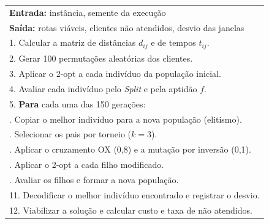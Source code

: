 \begin{quadro}[htb]
	\centering
	\caption{Fluxo do Algoritmo Genético Híbrido (GA+LS)}
	\label{quadro:gals}
	\begin{tabular}{p{}}
		\toprule
		\textbf{Entrada:} instância, semente da execução \\
		\textbf{Saída:} rotas viáveis, clientes não atendidos, desvio das janelas \\
		\midrule
		1. Calcular a matriz de distâncias $d_{ij}$ e de tempos $t_{ij}$. \\
		2. Gerar 100 permutações aleatórias dos clientes. \\
		3. Aplicar o 2-opt a cada indivíduo da população inicial. \\
		4. Avaliar cada indivíduo pelo \textit{Split} e pela aptidão $f$. \\
		5. \textbf{Para} cada uma das 150 gerações: \\
		\quad 6. Copiar o melhor indivíduo para a nova população (elitismo). \\
		\quad 7. Selecionar os pais por torneio ($k = 3$). \\
		\quad 8. Aplicar o cruzamento OX (0,8) e a mutação por inversão (0,1). \\
		\quad 9. Aplicar o 2-opt a cada filho modificado. \\
		\quad 10. Avaliar os filhos e formar a nova população. \\
		11. Decodificar o melhor indivíduo encontrado e registrar o desvio. \\
		12. Viabilizar a solução e calcular custo e taxa de não atendidos. \\
		\bottomrule
	\end{tabular}
\end{quadro}
